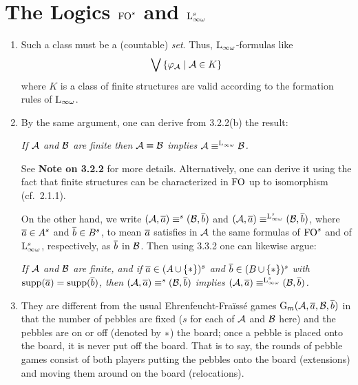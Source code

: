 \section{The Logics $\folog[s]$ and $\inflog[s]$}
\begin{enumerate}[1.]
%
\item {} Such a class must be a (countable) \emph{set}. Thus, $\inflog$-formulas like
\[
\bigvee {\{\varphi_{\mathcal{A}} \mid \mathcal{A} \in K\}}
\]
where $K$ is a class of finite structures are valid according to the formation rules of $\inflog$.
%
\item {} By the same argument, one can derive from 3.2.2(b) the result:
\begin{center}
\emph{If $\mathcal{A}$ and $\mathcal{B}$ are finite then $\mathcal{A} \equiv \mathcal{B}$ implies $\strct{A} \equv^{\inflog} \strct{B}$.}
\end{center}
See \textbf{Note on 3.2.2} for more details. Alternatively, one can derive it using the fact that finite structures can be characterized in $\folog$ up to isomorphism (cf.~2.1.1).

On the other hand, we write $(\mathcal{A}, \overline{a}) \equiv^s (\mathcal{B}, \overline{b})$ and $(\strct{A}, \vect{a}) \equv^{\inflog[s]} (\strct{B}, \vect{b})$, where $\overline{a} \in A^{s}$ and $\overline{b} \in B^{s}$, to mean $\overline{a}$ satisfies in $\mathcal{A}$ the same formulas of $\folog[s]$ and of $\inflog[s]$, respectively, as $\overline{b}$ in $\mathcal{B}$. Then using 3.3.2 one can likewise argue:
\begin{center}
\emph{If $\mathcal{A}$ and $\mathcal{B}$ are finite, and if $\overline{a} \in (A \mathop{\cup} {\{\ast\}})^{s}$ and $\overline{b} \in (B \mathop{\cup} {\{\ast\}})^{s}$ with $\mathrm{supp}(\overline{a}) = \mathrm{supp}(\overline{b})$, then $(\mathcal{A}, \overline{a}) \equiv^s (\mathcal{B}, \overline{b})$ implies $(\strct{A}, \vect{a}) \equv^{\inflog[s]} (\strct{B}, \vect{b})$.}
\end{center}
%
\item {} They are different from the usual Ehrenfeucht-Fra\"iss\'e games $\game{m}(\strct{A}, \vect{a}, \strct{B}, \vect{b})$ in that the number of pebbles are fixed ($s$ for each of $\mathcal{A}$ and $\mathcal{B}$ here) and the pebbles are on or off (denoted by $\ast$) the board; once a pebble is placed onto the board, it is never put off the board. That is to say, the rounds of pebble games consist of both players putting the pebbles onto the board (extensions) and moving them around on the board (relocations).


\end{enumerate}
